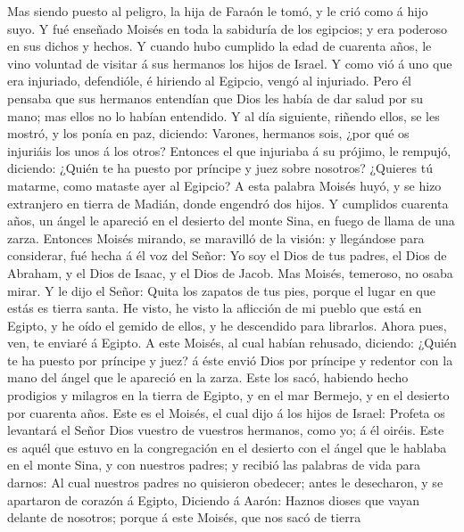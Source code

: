 Mas siendo puesto al peligro, la hija de Faraón le tomó, y
le crió como á hijo suyo.  Y fué enseñado Moisés en toda la
sabiduría de los egipcios; y era poderoso en sus dichos y hechos.
 Y cuando hubo cumplido la edad de cuarenta años, le vino
voluntad de visitar á sus hermanos los hijos de Israel.  Y
como vió á uno que era injuriado, defendióle, é hiriendo al Egipcio,
vengó al injuriado.  Pero él pensaba que sus hermanos
entendían que Dios les había de dar salud por su mano; mas ellos no lo
habían entendido.  Y al día siguiente, riñendo ellos, se
les mostró, y los ponía en paz, diciendo: Varones, hermanos sois, ¿por
qué os injuriáis los unos á los otros?  Entonces el que
injuriaba á su prójimo, le rempujó, diciendo: ¿Quién te ha puesto por
príncipe y juez sobre nosotros?  ¿Quieres tú matarme, como
mataste ayer al Egipcio?  A esta palabra Moisés huyó, y se
hizo extranjero en tierra de Madián, donde engendró dos hijos.
 Y cumplidos cuarenta años, un ángel le apareció en el
desierto del monte Sina, en fuego de llama de una zarza. 
Entonces Moisés mirando, se maravilló de la visión: y llegándose para
considerar, fué hecha á él voz del Señor:  Yo soy el Dios
de tus padres, el Dios de Abraham, y el Dios de Isaac, y el Dios de
Jacob. Mas Moisés, temeroso, no osaba mirar.  Y le dijo el
Señor: Quita los zapatos de tus pies, porque el lugar en que estás es
tierra santa.  He visto, he visto la aflicción de mi pueblo
que está en Egipto, y he oído el gemido de ellos, y he descendido para
librarlos. Ahora pues, ven, te enviaré á Egipto.  A este
Moisés, al cual habían rehusado, diciendo: ¿Quién te ha puesto por
príncipe y juez? á éste envió Dios por príncipe y redentor con la mano
del ángel que le apareció en la zarza.  Este los sacó,
habiendo hecho prodigios y milagros en la tierra de Egipto, y en el mar
Bermejo, y en el desierto por cuarenta años.  Este es el
Moisés, el cual dijo á los hijos de Israel: Profeta os levantará el
Señor Dios vuestro de vuestros hermanos, como yo; á él oiréis.
 Este es aquél que estuvo en la congregación en el desierto
con el ángel que le hablaba en el monte Sina, y con nuestros padres; y
recibió las palabras de vida para darnos:  Al cual nuestros
padres no quisieron obedecer; antes le desecharon, y se apartaron de
corazón á Egipto,  Diciendo á Aarón: Haznos dioses que
vayan delante de nosotros; porque á este Moisés, que nos sacó de tierra
